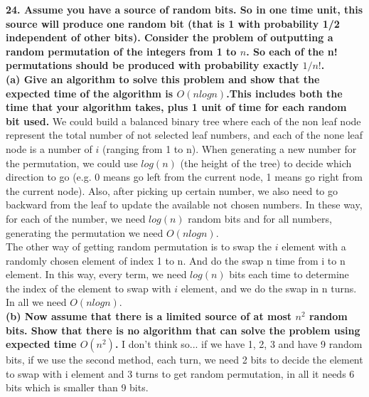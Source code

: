\documentclass{article}
\begin{document}
\textbf{24. Assume you have a source of random bits. So in one time unit, this source will produce one random bit (that is 1 with probability 1/2 independent of other bits). Consider the problem of outputting a random permutation of the integers from 1 to $n$. So each of the n! permutations should be produced with probability exactly $1/n!$.} \\ \newline
\textbf{(a) Give an algorithm to solve this problem and show that the expected time of the algorithm is $O(nlogn)$.This includes both the time that your algorithm takes, plus 1 unit of time for each random bit used.} \newline
We could build a balanced binary tree where each of the non leaf node represent the total number of not selected leaf numbers, and each of the none leaf node is a number of $i$ (ranging from 1 to n). When generating a new number for the permutation, we could use $log(n)$ (the height of the tree) to decide which direction to go (e.g. 0 means go left from the current node, 1 means go right from the current node). Also, after picking up certain number, we also need to go backward from the leaf to update the available not chosen numbers. In these way, for each of the number, we need $log(n)$ random bits and for all numbers, generating the permutation we need $O(nlogn)$.
\\ \newline
\newline
The other way of getting random permutation is to swap the $i$ element with a randomly chosen element of index 1 to n. And do the swap n time from i to n element. In this way, every term, we need $log(n)$ bits each time to determine the index of the element to swap with $i$ element, and we do the swap in n turns. In all we need $O(nlogn)$.
\\ \newline
\textbf{(b) Now assume that there is a limited source of at most $n^2$ random bits. Show that there is no algorithm that can solve the problem using expected time $O(n^2)$.}
\newline
I don't think so... if we have 1, 2, 3 and have 9 random bits, if we use the second method, each turn, we need 2 bits to decide the element to swap with i element and 3 turns to get random permutation, in all it needs 6 bits which is smaller than 9 bits.
\end{document}
